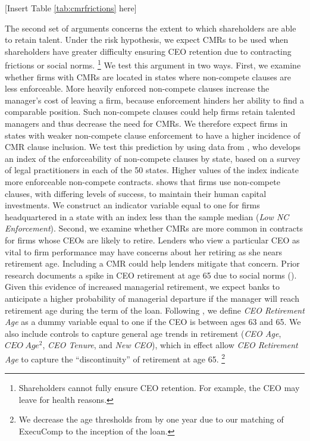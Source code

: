 \documentclass[a4paper,12pt]{article}
\begin{document}
\begin{center}
  [Insert Table \ref{tab:cmrfrictions} here]
\end{center}




The second set of arguments concerns the extent to which shareholders are able to retain talent.
Under the risk hypothesis, we expect CMRs to be used when shareholders have greater difficulty ensuring CEO retention due to contracting frictions or social norms.%
	\footnote{Shareholders cannot fully ensure CEO retention. For example, the CEO may leave for health reasons.}
We test this argument in two ways.
First, we examine whether firms with CMRs are located in states where non-compete clauses are less enforceable.
More heavily enforced non-compete clauses increase the manager's cost of leaving a firm, because enforcement hinders her ability to find a comparable position.
Such non-compete clauses could help firms retain talented managers and thus decrease the need for CMRs.
We therefore expect firms in states with weaker non-compete clause enforcement to have a higher incidence of CMR clause inclusion.
We test this prediction by using data from \citet{Garmaise_2011}, who develops an index of the enforceability of non-compete clauses by state, based on a survey of legal practitioners in each of the 50 states.
Higher values of the index indicate more enforceable non-compete contracts.
\citet{Garmaise_2011} shows that firms use non-compete clauses, with differing levels of success, to maintain their human capital investments.
We construct an indicator variable equal to one for firms headquartered in a state with an index less than the sample median (\textit{Low NC Enforcement}).
Second, we examine whether CMRs are more common in contracts for firms whose CEOs are likely to retire.
Lenders who view a particular CEO as vital to firm performance may have concerns about her retiring as she nears retirement age.
Including a CMR could help lenders mitigate that concern.
Prior research documents a spike in CEO retirement at age 65 due to social norms (\citet{Jenter_2015a}).
Given this evidence of increased managerial retirement, we expect banks to anticipate a higher probability of managerial departure if the manager will reach retirement age during the term of the loan.
Following \citet{Jenter_2015a}, we define \textit{CEO Retirement Age} as a dummy variable equal to one if the CEO is between ages 63 and 65.
We also include controls to capture general age trends in retirement (\textit{CEO Age}, $CEO\ Age^2$, \textit{CEO Tenure}, and \textit{New CEO}), which in effect allow \textit{CEO Retirement Age} to capture the ``discontinuity'' of retirement at age 65.%
    \footnote{We decrease the age thresholds from \citet{Jenter_2015a} by one year due to our matching of ExecuComp to the inception of the loan.}
\end{document}
